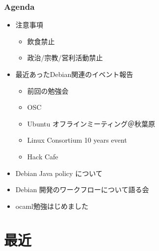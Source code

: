 \begin{frame}
 \frametitle{Agenda}
\begin{minipage}[t]{0.45\hsize}
  \begin{itemize}
  \item 注意事項
	\begin{itemize}
	 \item 飲食禁止
	 \item 政治/宗教/営利活動禁止
	\end{itemize}
  \item 最近あったDebian関連のイベント報告
	\begin{itemize}
	 \item 前回の勉強会
	 \item OSC
	 \item Ubuntu オフラインミーティング＠秋葉原
	 \item Linux Consortium 10 years event
	 \item Hack Cafe
	\end{itemize}
 \end{itemize}
\end{minipage} 
\begin{minipage}[t]{0.45\hsize}
 \begin{itemize}
  \item Debian Java policy について
  \item Debian 開発のワークフローについて語る会
  \item ocaml勉強はじめました
 \end{itemize}
\end{minipage}
\end{frame}

\section{最近}


